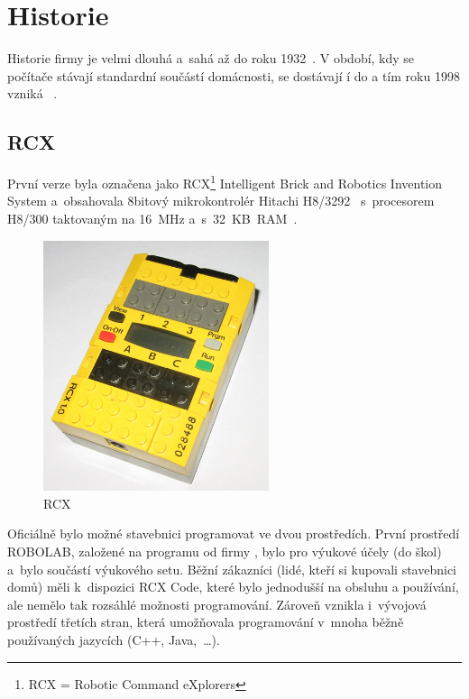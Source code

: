 \chapter{Historie \legoM}

Historie firmy \lego{ }je velmi dlouhá a~sahá až do roku 1932~\cite{lego_GroupHistory1930s}. 
V období, kdy se počítače stávají standardní součástí domácnosti, se dostávají í do \lego{} a tím roku 1998 vzniká  \legoM{}~\cite{lego_mindstormsHistory}.


\section{\legoM{ }RCX}

První verze byla označena jako \legoM{ }RCX\footnote{RCX = Robotic Command eXplorers} Intelligent Brick and Robotics Invention System a~obsahovala 8bitový mikrokontrolér Hitachi H8/3292~\cite{hitachi_microcontrolerH8series} s~procesorem H8/300 taktovaným na 16~MHz a~s~32~KB~RAM~\cite{legoMindstormsRCX_Manual}.

\begin{figure}[h]
	\centering
	\includegraphics[width=250px]{images/lego-mindstorms-rcx_wikipedia.jpg}
	\caption[\legoM{ }RCX]{\legoM{ }RCX\protect\footnotemark}
	\label{fig:lego-mindstorms-rcx-wikipedia}
\end{figure}


Oficiálně bylo možné stavebnici programovat ve dvou prostředích. První prostředí ROBOLAB, založené na programu \labview{ }od firmy \NI, bylo pro výukové účely (do škol) a~bylo součástí výukového setu. 
Běžní zákazníci (lidé, kteří si kupovali stavebnici domů) měli k~dispozici RCX Code, které bylo jednodušší na obsluhu a používání, ale nemělo tak rozsáhlé možnosti programování. 
Zároveň vznikla i~vývojová prostředí třetích stran, která umožňovala programování v~mnoha běžně používaných jazycích (C++, Java,~\dots).

